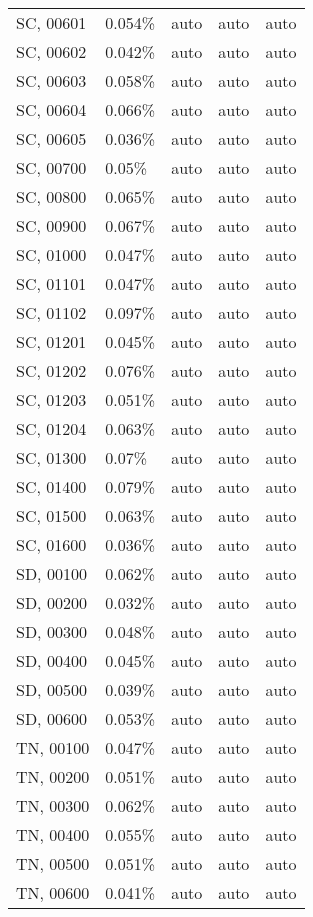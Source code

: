 \begin{longtable}[]{@{}lllll@{}}
SC, 00601 & 0.054\% & auto & auto & auto \\
SC, 00602 & 0.042\% & auto & auto & auto \\
SC, 00603 & 0.058\% & auto & auto & auto \\
SC, 00604 & 0.066\% & auto & auto & auto \\
SC, 00605 & 0.036\% & auto & auto & auto \\
SC, 00700 & 0.05\% & auto & auto & auto \\
SC, 00800 & 0.065\% & auto & auto & auto \\
SC, 00900 & 0.067\% & auto & auto & auto \\
SC, 01000 & 0.047\% & auto & auto & auto \\
SC, 01101 & 0.047\% & auto & auto & auto \\
SC, 01102 & 0.097\% & auto & auto & auto \\
SC, 01201 & 0.045\% & auto & auto & auto \\
SC, 01202 & 0.076\% & auto & auto & auto \\
SC, 01203 & 0.051\% & auto & auto & auto \\
SC, 01204 & 0.063\% & auto & auto & auto \\
SC, 01300 & 0.07\% & auto & auto & auto \\
SC, 01400 & 0.079\% & auto & auto & auto \\
SC, 01500 & 0.063\% & auto & auto & auto \\
SC, 01600 & 0.036\% & auto & auto & auto \\
SD, 00100 & 0.062\% & auto & auto & auto \\
SD, 00200 & 0.032\% & auto & auto & auto \\
SD, 00300 & 0.048\% & auto & auto & auto \\
SD, 00400 & 0.045\% & auto & auto & auto \\
SD, 00500 & 0.039\% & auto & auto & auto \\
SD, 00600 & 0.053\% & auto & auto & auto \\
TN, 00100 & 0.047\% & auto & auto & auto \\
TN, 00200 & 0.051\% & auto & auto & auto \\
TN, 00300 & 0.062\% & auto & auto & auto \\
TN, 00400 & 0.055\% & auto & auto & auto \\
TN, 00500 & 0.051\% & auto & auto & auto \\
TN, 00600 & 0.041\% & auto & auto & auto \\

\end{longtable}
